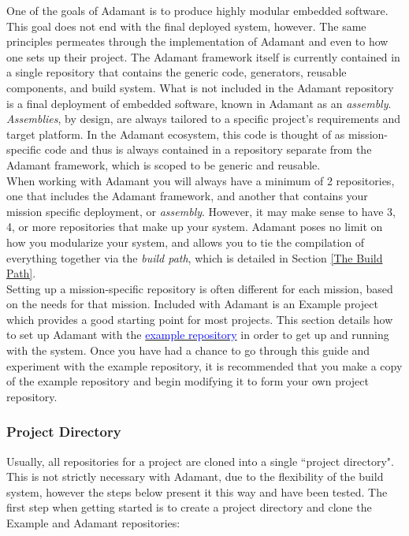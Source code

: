 One of the goals of Adamant is to produce highly modular embedded software. This goal does not end with the final deployed system, however. The same principles permeates through the implementation of Adamant and even to how one sets up their project. The Adamant framework itself is currently contained in a single repository that contains the generic code, generators, reusable components, and build system. What is not included in the Adamant repository is a final deployment of embedded software, known in Adamant as an \textit{assembly}. \textit{Assemblies}, by design, are always tailored to a specific project's requirements and target platform. In the Adamant ecosystem, this code is thought of as mission-specific code and thus is always contained in a repository separate from the Adamant framework, which is scoped to be generic and reusable. \\

When working with Adamant you will always have a minimum of 2 repositories, one that includes the Adamant framework, and another that contains your mission specific deployment, or \textit{assembly}. However, it may make sense to have 3, 4, or more repositories that make up your system. Adamant poses no limit on how you modularize your system, and allows you to tie the compilation of everything together via the \textit{build path}, which is detailed in Section \ref{The Build Path}. \\

Setting up a mission-specific repository is often different for each mission, based on the needs for that mission. Included with Adamant is an Example project which provides a good starting point for most projects. This section details how to set up Adamant with the \href{https://github.com/lasp/adamant_example}{\textcolor{blue}{example repository}} in order to get up and running with the system. Once you have had a chance to go through this guide and experiment with the example repository, it is recommended that you make a copy of the example repository and begin modifying it to form your own project repository. \\

\subsubsection{Project Directory}

Usually, all repositories for a project are cloned into a single ``project directory". This is not strictly necessary with Adamant, due to the flexibility of the build system, however the steps below present it this way and have been tested. The first step when getting started is to create a project directory and clone the Example and Adamant repositories:

